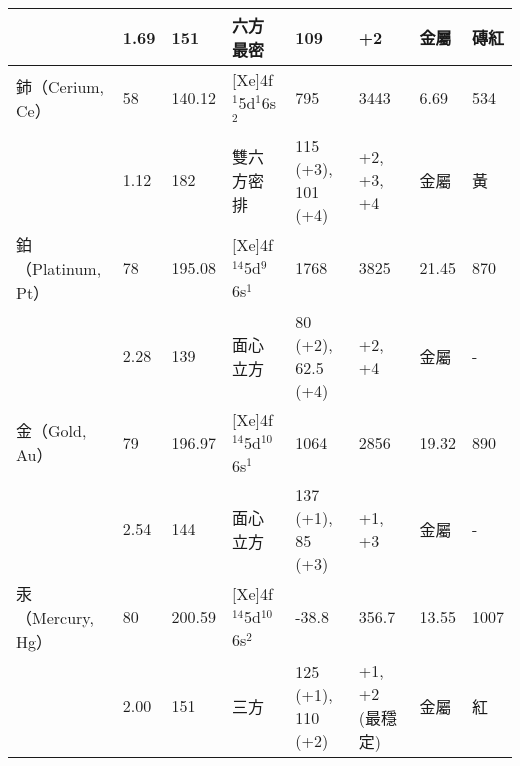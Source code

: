 \documentclass[a4paper,12pt]{report}
\begin{document}
\begin{longtable}[c]{|p{}|p{}|p{}|p{}|p{}|p{}|p{}|p{}|}
& 1.69 & 151 & 六方最密 & 109 & +2 & 金屬 & 磚紅\\\hline
鈰（Cerium, Ce） & 58 & 140.12 & [Xe]4f$^1$5d$^1$6s$^2$ & 795 & 3443 & 6.69 & 534 \\\cline{2-8}
& 1.12 & 182 & 雙六方密排 & 115 (+3), 101 (+4) & +2, +3, +4 & 金屬 & 黃\\\hline
鉑（Platinum, Pt） & 78 & 195.08 & [Xe]4f$^{14}$5d$^9$6s$^1$ & 1768 & 3825 & 21.45 & 870\\\cline{2-8}
& 2.28 & 139 & 面心立方 & 80 (+2), 62.5 (+4) & +2, +4 & 金屬 & -\\\hline
金（Gold, Au） & 79 & 196.97 & [Xe]4f$^{14}$5d$^{10}$6s$^1$ & 1064 & 2856 & 19.32 & 890\\\cline{2-8}
& 2.54 & 144 & 面心立方 & 137 (+1), 85 (+3) & +1, +3 & 金屬 & -\\\hline
汞（Mercury, Hg） & 80 & 200.59 & [Xe]4f$^{14}$5d$^{10}$6s$^2$ & -38.8 & 356.7 & 13.55 & 1007\\\cline{2-8}
& 2.00 & 151 & 三方 & 125 (+1), 110 (+2) & +1, +2 (最穩定) & 金屬 & 紅\\\hline
\end{longtable}\FloatBarrier
{}
\end{document}
